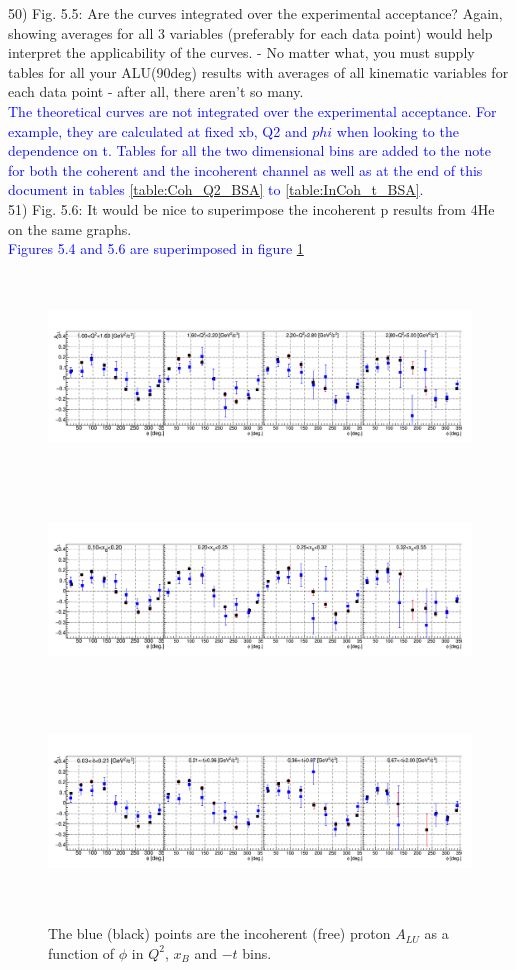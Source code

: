 50) Fig. 5.5: Are the curves integrated over the experimental acceptance? 
Again, showing averages for all 3 variables (preferably for each data point) 
would help interpret the applicability of the curves.
- No matter what, you must supply tables for all your ALU(90deg) results with 
averages of all kinematic variables for each data point - after all, there 
aren't so many. \\
\textcolor{blue}{The theoretical curves are not integrated over the 
   experimental acceptance. For example, they are calculated at fixed xb, Q2 
   and $phi$ when looking to the dependence on t. Tables for all the two 
   dimensional bins are added to the note for both the coherent and the 
   incoherent channel as well as at the end of this document in tables 
   \ref{table:Coh_Q2_BSA} to \ref{table:InCoh_t_BSA}.  
} \\  

51) Fig. 5.6: It would be nice to superimpose the incoherent p results from 4He 
on the same graphs.\\
\textcolor{blue}{ Figures 5.4 and 5.6 are superimposed in figure
\ref{fig:incoh_free_ALU}}
\begin{figure}[tbp]

   \includegraphics[height=5.5cm]{fig/Q2_dep.png}
   \includegraphics[height=5.5cm]{fig/xB_dep.png}
   \includegraphics[height=5.5cm]{fig/t_dep.png}
   \caption{The blue (black) points are the incoherent (free) proton $A_{LU}$ 
   as a function of $\phi$ in $Q^{2}$, $x_{B}$ and $-t$ bins.}
   \label{fig:incoh_free_ALU}
\end{figure}
\\

